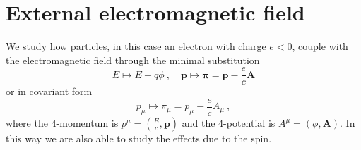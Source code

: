 \section{External electromagnetic field}

    We study how particles, in this case an electron with charge $e < 0$, couple with the electromagnetic field through the minimal substitution 
    \begin{equation*}
        E \mapsto E - q \phi ~, \quad \mathbf p \mapsto \boldsymbol \pi = \mathbf p - \frac{e}{c} \mathbf A
    \end{equation*}
    or in covariant form 
    \begin{equation*}
        p_\mu \mapsto \pi_\mu = p_\mu - \frac{e}{c} A_\mu  ~,
    \end{equation*}
    where the $4$-momentum is $p^\mu = (\frac{E}{c}, \mathbf p)$ and the $4$-potential is $A^\mu = (\phi, \mathbf A)$. In this way we are also able to study the effects due to the spin.

